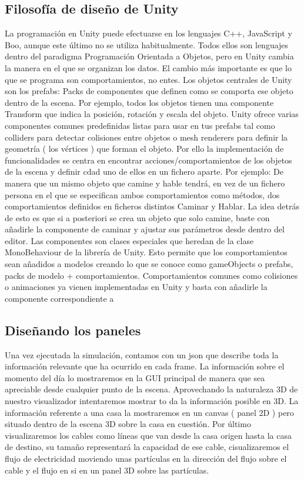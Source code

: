 \documentclass[12pt,a4paper,openright,oneside]{article}
\numberwithin{equation}{section}
\theoremstyle{definition}
\begin{document}
\subsection{Filosofía de diseño de Unity}
La programación en Unity puede efectuarse en los lenguajes C++, JavaScript y Boo, aunque este último no se utiliza habitualmente. Todos ellos son lenguajes dentro del paradigma Programación Orientada a Objetos, pero en Unity cambia la manera en el que se organizan los datos. El cambio más importante es que lo que se programa son comportamientos, no entes. Los objetos centrales de Unity son los prefabs: Packs de componentes que definen como se comporta ese objeto dentro de la escena. Por ejemplo, todos los objetos tienen una componente Transform que indica la posición, rotación y escala del objeto. Unity ofrece varias componentes comunes predefinidas listas para usar en tus prefabs tal como colliders para detectar colisiones entre objetos o mesh renderers para definir la geometría ( los vértices ) que forman el objeto. Por ello la implementación de funcionalidades se centra en encontrar acciones/comportamientos de los objetos de la escena y definir cdad uno de ellos en un fichero aparte. Por ejemplo: De manera que un mismo objeto que camine y hable tendrá, en vez de un fichero persona en el que se especifican ambos comportamientos como métodos, dos comportamientos definidos en ficheros distintos Caminar y Hablar. La idea detrás de esto es que si a posteriori se crea un objeto que solo camine, baste con añadirle la componente de caminar y ajustar sus parámetros desde dentro del editor. Las componentes son clases especiales que heredan de la clase MonoBehaviour de la librería de Unity. Esto permite que los comportamientos sean añadidos a modelos creando lo que se conoce como gameObjects o prefabs, packs de modelo + comportamientos. Comportamientos comunes como colisiones o animaciones ya vienen implementadas en Unity y basta con añadirle la componente correspondiente a  

\subsection{Diseñando los paneles}
Una vez ejecutada la simulación, contamos con un json que describe toda la información relevante que ha ocurrido en cada frame. La información sobre el momento del día lo mostraremos en la GUI principal de manera que sea apreciable desde cualquier punto de la escena. Aprovechando la naturaleza 3D de nuestro visualizador intentaremos mostrar to da la información posible en 3D. La información referente a una casa la mostraremos en un canvas ( panel 2D ) pero situado dentro de la escena 3D sobre la casa en cuestión. Por último visualizaremos los cables como líneas que van desde la casa origen hasta la casa de destino, su tamaño representará la capacidad de ese cable, cisualizaremos el flujo de electricidad moviendo unas partículas en la dirección del flujo sobre el cable y el flujo en si en un panel 3D sobre las partículas.
\end{document}
